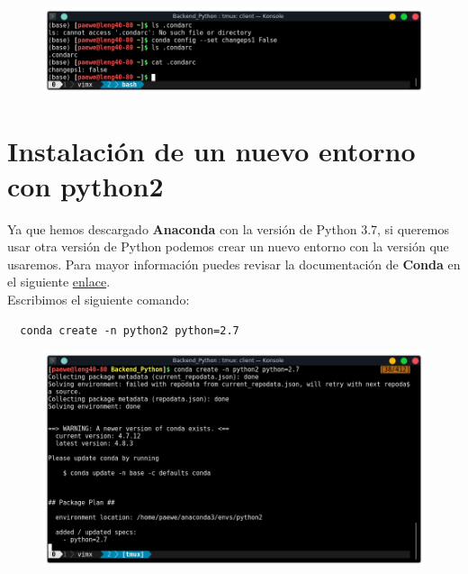 \documentclass{article}
\begin{document}
\begin{figure}[h!]
  \centering
  \includegraphics[scale=0.75]{./Pictures/009_changeps1_false.png}
\end{figure}

\newpage

\section*{Instalación de un nuevo entorno con python2}%

Ya que hemos descargado \textbf{Anaconda} con la versión de Python 3.7, si
queremos usar otra versión de Python podemos crear un nuevo entorno con la
versión que usaremos. Para mayor información puedes revisar la documentación de
\textbf{Conda} en el siguiente
\href{https://docs.conda.io/projects/conda/en/latest/user-guide/tasks/manage-environments.html#creating-an-environment-with-commands}{enlace}.\\

Escribimos el siguiente comando:

\begin{verbatim}
  conda create -n python2 python=2.7
\end{verbatim}

\begin{figure}[h!]
  \centering
  \includegraphics[scale=0.75]{./Pictures/001_crear_env_python2.png}
\end{figure}
\end{document}
